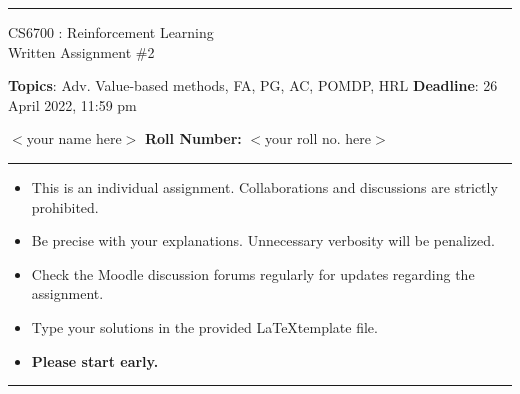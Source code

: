 \documentclass[addpoints,12pt,solution]{exam}
\begin{document}
\hrule
\vspace{1mm}
\noindent 
\begin{center}
{\Large CS6700 : Reinforcement Learning} \\
{\large Written Assignment \#2}
\end{center}
\vspace{1mm}
\noindent 
\footnotesize{{\textbf{Topics}: Adv. Value-based methods, FA, PG, AC, POMDP, HRL} \hfill \textbf{Deadline}: 26 April 2022, 11:59 pm


 $<$your name here$>$ \hfill {\bf Roll Number:} $<$your roll no. here$>$}
\vspace{2mm}
\hrule

{\small

\begin{itemize}\itemsep0mm
\item This is an individual assignment. Collaborations and discussions are strictly
prohibited.
\item Be precise with your explanations. Unnecessary verbosity will be penalized.
\item Check the Moodle discussion forums regularly for updates regarding the assignment.
\item Type your solutions in the provided \LaTeX template file.
\item \textbf{Please start early.}
\end{itemize}
}

\hrule

\vspace{3mm}




\end{document}
